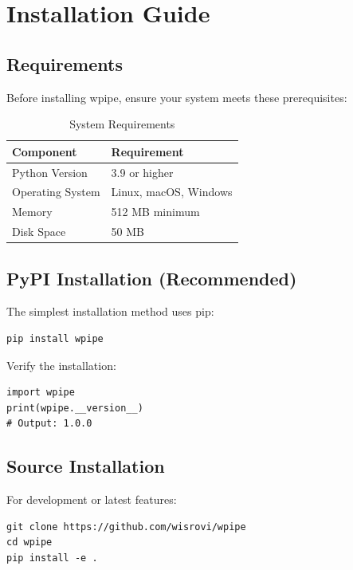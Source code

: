 \documentclass[12pt,a4paper]{report}
\begin{document}
\chapter{Installation Guide}
\cleardoublepage

\section{Requirements}

Before installing wpipe, ensure your system meets these prerequisites:

\begin{table}[H]
    \centering
    \caption{System Requirements}
    \label{tab:requirements}
    \begin{tabular}{ll}
        \toprule
        \textbf{Component} & \textbf{Requirement} \\
        \midrule
        Python Version & 3.9 or higher \\
        Operating System & Linux, macOS, Windows \\
        Memory & 512 MB minimum \\
        Disk Space & 50 MB \\
        \bottomrule
    \end{tabular}
\end{table}

\section{PyPI Installation (Recommended)}

The simplest installation method uses pip:

\begin{lstlisting}[caption={PyPI Installation}, label={lst:pypi-install}]
pip install wpipe
\end{lstlisting}

Verify the installation:

\begin{lstlisting}[caption={Verification}, label={lst:verify}]
import wpipe
print(wpipe.__version__)
# Output: 1.0.0
\end{lstlisting}

\section{Source Installation}

For development or latest features:

\begin{lstlisting}[caption={Source Installation}, label={lst:source-install}]
git clone https://github.com/wisrovi/wpipe
cd wpipe
pip install -e .
\end{lstlisting}
\end{document}
